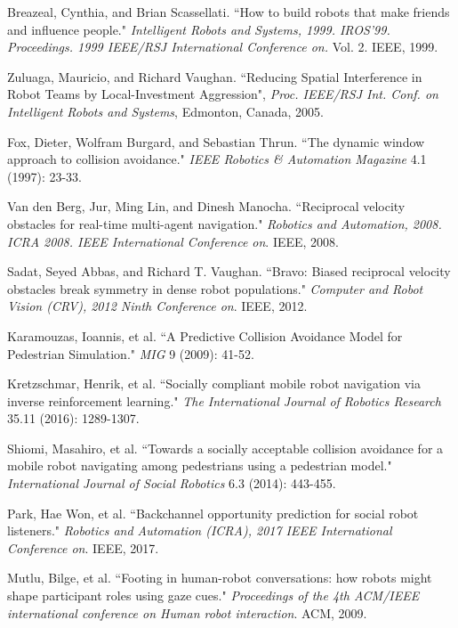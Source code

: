 \documentclass[letterpaper, 10 pt, conference]{ieeeconf}  %
\begin{document}
\begin{thebibliography}{99}


 Breazeal, Cynthia, and Brian Scassellati. ``How to build robots that make friends and influence people." \textit{Intelligent Robots and Systems, 1999. IROS'99. Proceedings. 1999 IEEE/RSJ International Conference on.} Vol. 2. IEEE, 1999.

 Zuluaga, Mauricio, and Richard Vaughan. ``Reducing Spatial Interference in Robot Teams by Local-Investment Aggression", \textit{Proc. IEEE/RSJ Int. Conf. on Intelligent Robots and Systems}, Edmonton, Canada, 2005.

 Fox, Dieter, Wolfram Burgard, and Sebastian Thrun. ``The dynamic window approach to collision avoidance." \textit{IEEE Robotics & Automation Magazine} 4.1 (1997): 23-33.

 Van den Berg, Jur, Ming Lin, and Dinesh Manocha. ``Reciprocal velocity obstacles for real-time multi-agent navigation." \textit{Robotics and Automation, 2008. ICRA 2008. IEEE International Conference on}. IEEE, 2008.

 Sadat, Seyed Abbas, and Richard T. Vaughan. ``Bravo: Biased reciprocal velocity obstacles break symmetry in dense robot populations." \textit{Computer and Robot Vision (CRV), 2012 Ninth Conference on}. IEEE, 2012.

 Karamouzas, Ioannis, et al. ``A Predictive Collision Avoidance Model for Pedestrian Simulation." \textit{MIG} 9 (2009): 41-52.

 Kretzschmar, Henrik, et al. ``Socially compliant mobile robot navigation via inverse reinforcement learning." \textit{The International Journal of Robotics Research} 35.11 (2016): 1289-1307.

 Shiomi, Masahiro, et al. ``Towards a socially acceptable collision avoidance for a mobile robot navigating among pedestrians using a pedestrian model." \textit{International Journal of Social Robotics} 6.3 (2014): 443-455.

 Park, Hae Won, et al. ``Backchannel opportunity prediction for social robot listeners." \textit{Robotics and Automation (ICRA), 2017 IEEE International Conference on}. IEEE, 2017.

 Mutlu, Bilge, et al. ``Footing in human-robot conversations: how robots might shape participant roles using gaze cues." \textit{Proceedings of the 4th ACM/IEEE international conference on Human robot interaction}. ACM, 2009.


\end{thebibliography}
\end{document}
